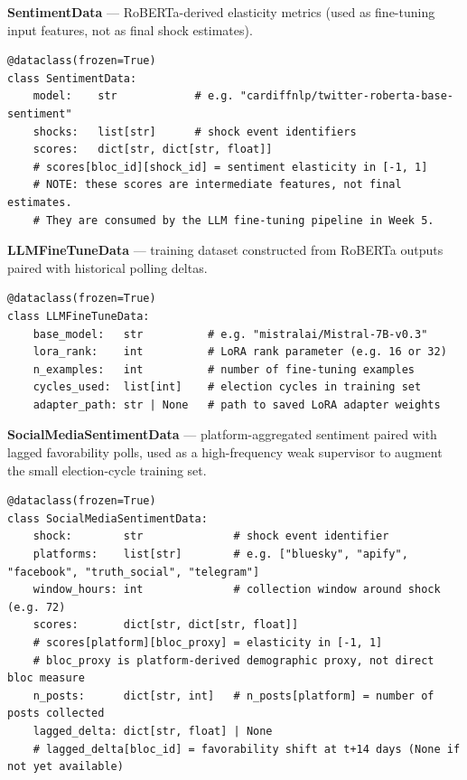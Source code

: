 \documentclass[11pt]{article}
\begin{document}
\noindent\textbf{SentimentData} --- RoBERTa-derived elasticity metrics (used as fine-tuning
input features, not as final shock estimates).
\begin{lstlisting}
@dataclass(frozen=True)
class SentimentData:
    model:    str            # e.g. "cardiffnlp/twitter-roberta-base-sentiment"
    shocks:   list[str]      # shock event identifiers
    scores:   dict[str, dict[str, float]]
    # scores[bloc_id][shock_id] = sentiment elasticity in [-1, 1]
    # NOTE: these scores are intermediate features, not final estimates.
    # They are consumed by the LLM fine-tuning pipeline in Week 5.
\end{lstlisting}

\noindent\textbf{LLMFineTuneData} --- training dataset constructed from RoBERTa outputs
paired with historical polling deltas.
\begin{lstlisting}
@dataclass(frozen=True)
class LLMFineTuneData:
    base_model:   str          # e.g. "mistralai/Mistral-7B-v0.3"
    lora_rank:    int          # LoRA rank parameter (e.g. 16 or 32)
    n_examples:   int          # number of fine-tuning examples
    cycles_used:  list[int]    # election cycles in training set
    adapter_path: str | None   # path to saved LoRA adapter weights
\end{lstlisting}

\noindent\textbf{SocialMediaSentimentData} --- platform-aggregated sentiment paired
with lagged favorability polls, used as a high-frequency weak supervisor to augment
the small election-cycle training set.
\begin{lstlisting}
@dataclass(frozen=True)
class SocialMediaSentimentData:
    shock:        str              # shock event identifier
    platforms:    list[str]        # e.g. ["bluesky", "apify", "facebook", "truth_social", "telegram"]
    window_hours: int              # collection window around shock (e.g. 72)
    scores:       dict[str, dict[str, float]]
    # scores[platform][bloc_proxy] = elasticity in [-1, 1]
    # bloc_proxy is platform-derived demographic proxy, not direct bloc measure
    n_posts:      dict[str, int]   # n_posts[platform] = number of posts collected
    lagged_delta: dict[str, float] | None
    # lagged_delta[bloc_id] = favorability shift at t+14 days (None if not yet available)
\end{lstlisting}
\end{document}
